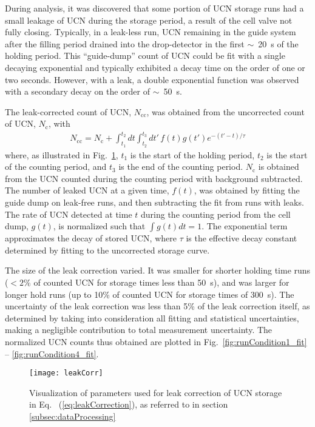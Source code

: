 During analysis, it was discovered that some portion of UCN storage runs had a small leakage of UCN during the storage period, a result of the cell valve not fully closing. Typically, in a leak-less run, UCN remaining in the guide system after the filling period drained into the drop-detector in the first $\sim$~\qty{20}{\s} of the holding period. This ``guide-dump'' count of UCN could be fit with a single decaying exponential and typically exhibited a decay time on the order of one or two seconds. However, with a leak, a double exponential function was observed with a secondary decay on the order of $\sim$~\qty{50}{\s}. 

The leak-corrected count of UCN, $N_\text{cc}$, was obtained from the uncorrected count of UCN, $N_\text{c}$, with
%
\begin{gather}
    N_\text{cc} = N_\text{c} + \int^{t_2}_{t_1} dt \int^{t_3}_{t_2} dt'\, f(t)g(t') e^{-(t'-t)/\tau}\label{eq:leakCorrection}
\end{gather}
%
where, as illustrated in Fig.~\ref{fig:leakCorrection}, $t_1$ is the start of the holding period, $t_2$ is the start of the counting period, and $t_3$ is the end of the counting period. $N_\text{c}$ is obtained from the UCN counted during the counting period with background subtracted. The number of leaked UCN at a given time, $f(t)$, was obtained by fitting the guide dump on leak-free runs, and then subtracting the fit from runs with leaks. The rate of UCN detected at time $t$ during the counting period from the cell dump, $g(t)$, is normalized such that $\int g(t) dt = 1$.  The exponential term approximates the decay of stored UCN, where $\tau$ is the effective decay constant determined by fitting to the uncorrected storage curve.

The size of the leak correction varied. It was smaller for shorter holding time runs ($ < 2\%$ of counted UCN for storage times less than \qty{50}{\s}), and was larger for longer hold runs (up to 10\% of counted UCN for storage times of \qty{300}{\s}). The uncertainty of the leak correction was less than 5\% of the leak correction itself, as determined by taking into consideration all fitting and statistical uncertainties, making a negligible contribution to total measurement uncertainty. The normalized UCN counts thus obtained are plotted in Fig.~\ref{fig:runCondition1_fit} -- \ref{fig:runCondition4_fit}.

\begin{figure}[htp]
    \centering
    \texttt{[image: leakCorr]}
    \caption[Visualization of parameters used for leak correction of UCN storage in Eq.~ (\ref{eq:leakCorrection})]{Visualization of parameters used for leak correction of UCN storage in Eq.~ (\ref{eq:leakCorrection}), as referred to in section \ref{subsec:dataProcessing}}
    \label{fig:leakCorrection}
\end{figure}

